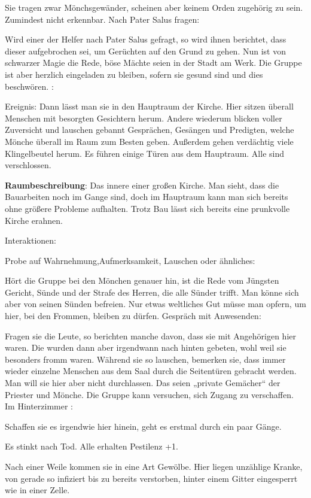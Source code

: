 Sie tragen zwar Mönchsgewänder, scheinen aber keinem Orden zugehörig zu sein.
Zumindest nicht erkennbar.
Nach Pater Salus fragen:

Wird einer der Helfer nach Pater Salus gefragt, so wird ihnen berichtet, dass dieser aufgebrochen sei, um Gerüchten auf den Grund zu gehen.
Nun ist von schwarzer Magie die Rede, böse Mächte seien in der Stadt am Werk. Die Gruppe ist aber herzlich eingeladen zu bleiben, sofern sie gesund sind und dies beschwören.
:

Ereignis: Dann lässt man sie in den Hauptraum der Kirche. Hier sitzen überall Menschen mit besorgten Gesichtern herum. Andere wiederum blicken voller Zuversicht und lauschen gebannt Gesprächen, Gesängen und Predigten, welche Mönche überall im Raum zum Besten geben. Außerdem gehen verdächtig viele Klingelbeutel herum. Es führen einige Türen aus dem Hauptraum. Alle sind verschlossen.

\textbf{Raumbeschreibung}: Das innere einer großen Kirche. Man sieht, dass die Bauarbeiten noch im Gange sind, doch im Hauptraum kann man sich bereits ohne größere Probleme aufhalten. Trotz Bau lässt sich bereits eine prunkvolle Kirche erahnen.

Interaktionen:

Probe auf Wahrnehmung,Aufmerksamkeit, Lauschen oder ähnliches:

Hört die Gruppe bei den Mönchen genauer hin, ist die Rede vom Jüngsten Gericht,
Sünde und der Strafe des Herren, die alle Sünder trifft.
Man könne sich aber von seinen Sünden befreien.
Nur etwas weltliches Gut müsse man opfern, um hier,
bei den Frommen, bleiben zu dürfen.
Gespräch mit Anwesenden:

Fragen sie die Leute, so berichten manche davon, dass sie mit Angehörigen hier waren.
Die wurden dann aber irgendwann nach hinten gebeten, wohl weil sie besonders fromm waren. Während sie so lauschen, bemerken sie, dass immer wieder einzelne Menschen aus dem Saal durch die Seitentüren gebracht werden.
Man will sie hier aber nicht durchlassen. Das seien „private Gemächer“ der Priester und Mönche. Die Gruppe kann versuchen, sich Zugang zu verschaffen.
Im Hinterzimmer
:

Schaffen sie es irgendwie hier hinein, geht es erstmal durch ein paar Gänge.

Es stinkt nach Tod. Alle erhalten Pestilenz +1.

Nach einer Weile kommen sie in eine Art Gewölbe. Hier liegen unzählige Kranke, von gerade so infiziert bis zu bereits verstorben, hinter einem Gitter eingesperrt wie in einer Zelle.

